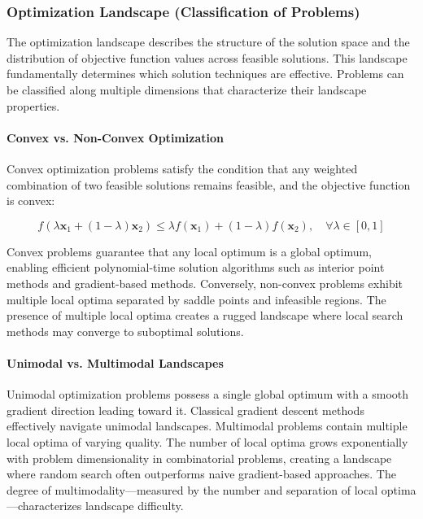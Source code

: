 \subsubsection{Optimization Landscape (Classification of Problems)}

The optimization landscape describes the structure of the solution space and the distribution of objective function values across feasible solutions. This landscape fundamentally determines which solution techniques are effective. Problems can be classified along multiple dimensions that characterize their landscape properties.

\paragraph{Convex vs. Non-Convex Optimization}

Convex optimization problems satisfy the condition that any weighted combination of two feasible solutions remains feasible, and the objective function is convex:

\begin{equation}
f(\lambda \mathbf{x}_1 + (1-\lambda)\mathbf{x}_2) \leq \lambda f(\mathbf{x}_1) + (1-\lambda) f(\mathbf{x}_2), \quad \forall \lambda \in [0,1]
\end{equation}

Convex problems guarantee that any local optimum is a global optimum, enabling efficient polynomial-time solution algorithms such as interior point methods and gradient-based methods. Conversely, non-convex problems exhibit multiple local optima separated by saddle points and infeasible regions. The presence of multiple local optima creates a rugged landscape where local search methods may converge to suboptimal solutions.

\paragraph{Unimodal vs. Multimodal Landscapes}

Unimodal optimization problems possess a single global optimum with a smooth gradient direction leading toward it. Classical gradient descent methods effectively navigate unimodal landscapes. Multimodal problems contain multiple local optima of varying quality. The number of local optima grows exponentially with problem dimensionality in combinatorial problems, creating a landscape where random search often outperforms naive gradient-based approaches. The degree of multimodality—measured by the number and separation of local optima—characterizes landscape difficulty.

